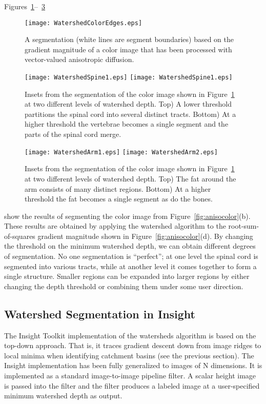 Figures~\ref{fig:colorsegment1}--~\ref{fig:colorsegment3}
\begin{figure}
\centering
\texttt{[image: WatershedColorEdges.eps]}
\caption{
A segmentation (white lines are segment boundaries) based on 
the gradient magnitude of a color image that has been processed with 
vector-valued anisotropic diffusion.}
\protect\label{fig:colorsegment1}
\end{figure}
\begin{figure}
\centering
\texttt{[image: WatershedSpine1.eps]}
\texttt{[image: WatershedSpine1.eps]}
\caption{
Insets from the segmentation of the color image shown in 
Figure~\protect\ref{fig:colorsegment1} at two different levels of 
watershed depth.  Top) A lower threshold partitions the spinal cord
into several distinct tracts.  Bottom) At a higher threshold the 
vertebrae becomes a single segment and the parts of the 
spinal cord merge.
}
\protect\label{fig:colorsegment2}
\end{figure}
\begin{figure}
\centering
\texttt{[image: WatershedArm1.eps]}
\texttt{[image: WatershedArm2.eps]}
\caption{
Insets from the segmentation of the color image shown in 
Figure~\protect\ref{fig:colorsegment1} at two different levels of 
watershed depth.  Top) The fat around the arm consists of many 
distinct regions.  Bottom) At a higher threshold the 
fat becomes a single segment as do the bones.
}
\protect\label{fig:colorsegment3}
\end{figure}
show the results of segmenting the color image from
Figure~\ref{fig:anisocolor}(b).  These results are obtained by applying the
watershed algorithm to the root-sum-of-squares gradient magnitude shown in
Figure~\ref{fig:anisocolor}(d).  By changing the threshold on the minimum
watershed depth, we can obtain different degrees of segmentation.  No one
segmentation is ``perfect''; at one level the spinal cord is segmented into
various tracts, while at another level it comes together to form a single
structure.  Smaller regions can be expanded into larger regions by either
changing the depth threshold or combining them under some user direction.

\subsection{Watershed Segmentation in Insight}
\label{sec:ImplementationWatersheds}
The Insight Toolkit implementation of the watersheds algorithm is based on the
top-down approach.  That is, it traces gradient descent down from image ridges
to local minima when identifying catchment basins (see the previous
section). The Insight implementation has been fully generalized to images of N
dimensions.  It is implemented as a standard image-to-image pipeline filter.
A scalar height image is passed into the filter and the filter produces a
labeled image at a user-specified minimum watershed depth as output.

